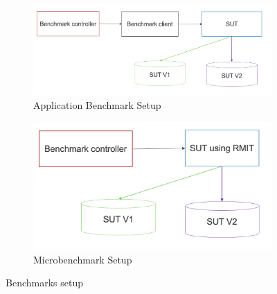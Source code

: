\begin{figure}[!htbp]
    \captionsetup[subfigure]{list=true}
    \centering
    \begin{subfigure}[b]{0.49\textwidth}
        \centering
        \includegraphics[width=\textwidth]{figures/Application setup.png}
        \caption{Application Benchmark Setup}
        \label{fig:applicationBenchmark-setup}
    \end{subfigure}
    \hfill
    \begin{subfigure}[b]{0.49\textwidth}
        \centering
        \includegraphics[width=\textwidth]{figures/Microbenchemark setup.png}
        \caption{Microbenchmark Setup}
        \label{fig:microbenchmark-setup}
    \end{subfigure}
    \caption{Benchmarks setup}
    \label{fig:benchmarks-setup}
\end{figure}


